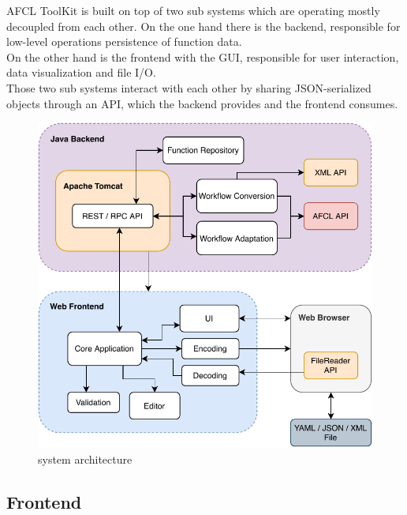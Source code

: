 \documentclass[a4paper,top=25mm,bottom=25mm,12pt,pdftex,halfparskip,twoside,bibtotoc,numbers=noenddot]{scrbook}
\begin{document}

AFCL ToolKit is built on top of two sub systems which are operating mostly decoupled from each other. On the one hand there is the backend, responsible for low-level operations persistence of function data.\\
On the other hand is the frontend with the GUI, responsible for user interaction, data visualization and file I/O.\\
Those two sub systems interact with each other by sharing JSON-serialized objects through an API, which the backend provides and the frontend consumes.


\begin{figure}[H]
  \centering
  \vspace{0.8cm}
  \includegraphics{architecture}
  \caption{system architecture}
\end{figure}

\subsection{Frontend}
\end{document}
